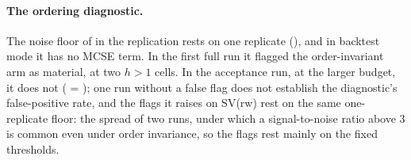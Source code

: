 \paragraph{The ordering diagnostic.}
The noise floor of  in the replication rests on one replicate
(), and in backtest mode it has no MCSE term. In the first full run it flagged
the order-invariant  arm as material, at two $h > 1$ cells. %
In the acceptance run, at the larger budget, it does not ( =
); one run without a false flag does not establish the
diagnostic's false-positive rate, and the flags it raises on SV(rw) rest on the same
one-replicate floor: the spread of two runs, under which a signal-to-noise ratio above 3 is
common even under order invariance, so the flags rest mainly on the fixed thresholds. %

